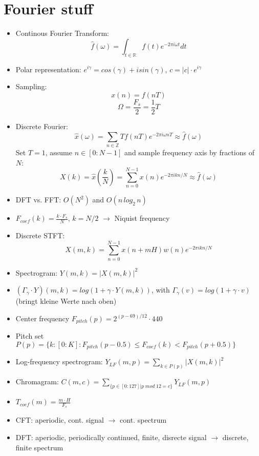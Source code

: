 \documentclass{scrartcl}
\begin{document}
\section{Fourier stuff}
\begin{itemize}
    \item
        Continous Fourier Transform:
        $$\hat{f}(\omega) = \int_{t \in \mathbb{R}} f(t) e^{-2 \pi i \omega t} dt$$
    \item
        Polar representation:
        $e^{i \gamma} = cos(\gamma) + i sin(\gamma)$, $c = |c| \cdot e^{i \gamma}$\\
    \item
        Sampling:
        $$x(n) = f(nT)$$
        $$\Omega = \frac{F_s}{2} = \frac{1}{2} T$$ 
    \item
        Discrete Fourier:
        $$ \hat{x}(\omega) = \sum_{n \in \mathbb{Z}} T f(nT) e^{-2 \pi i \omega n T} \approx \hat{f}(\omega) $$
        Set $T=1$, assume $n \in [0:N-1]$ and sample frequency axis by fractions of $N$:
        $$ X(k) = \hat{x}(\frac{k}{N}) =  \sum_{n = 0}^{N-1} x(n) e^{-2 \pi i k n/N} \approx \hat{f}(\omega) $$
    \item 
        DFT vs. FFT: $O(N^2)$ and $O(n \, log_2 \, n)$
    \item
        $F_{coef}(k) = \frac{k \cdot F_s}{N}$, $k=N/2$ $\rightarrow$ Niquist frequency
    \item
        Discrete STFT:
        $$X(m, k) = \sum_{n=0}^{N-1} x(n+mH) w(n) e^{-2 \pi i k n/N}$$
    \item
        Spectrogram: $ Y(m,k) = |X(m,k)|^2$
    \item
        $(\Gamma_{\gamma} \cdot Y)(m, k) = log(1 + \gamma \cdot Y(m,k))$, with $\Gamma_{\gamma}(v) = log(1 + \gamma \cdot v)$ (bringt kleine Werte nach oben)
    \item
        Center frequency $F_{pitch}(p) = 2^{(p-69)/12} \cdot 440$
    \item
        Pitch set $P(p) = \{k: [0:K]: F_{pitch}(p-0.5) \leq F_{coef}(k) < F_{pitch}(p+0.5)\}$
    \item
        Log-frequency spectrogram: $Y_{LF}(m,p) = \sum_{k \in P(p)} |X(m,k)|^2$
    \item
        Chromagram: $C(m,c) = \sum_{\{ p \in [0:127] | p \; mod \; 12 = c\}} Y_{LF}(m,p)$
    \item
        $T_{coef}(m) = \frac{m \cdot H}{F_s}$\\

    \item
        CFT: aperiodic, cont. signal $\rightarrow$ cont. spectrum
    \item
        DFT: aperiodic, periodically continued, finite, disrecte signal $\rightarrow$ discrete, finite spectrum
\end{itemize}
\end{document}
